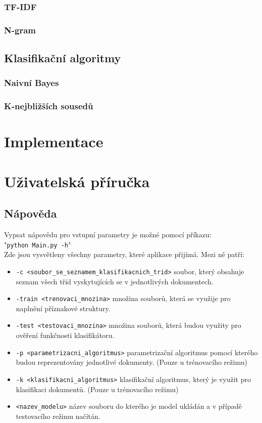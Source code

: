 \documentclass[ 12pt, a4paper]{article}
\begin{document}
\subsubsection{TF-IDF}
\subsubsection{N-gram}

\subsection{Klasifikační algoritmy}
\subsubsection{Naivní Bayes}
\subsubsection{K-nejbližších sousedů}

\newpage
\section{Implementace}


\newpage
\section{Uživatelská příručka}
\subsection{Nápověda}
Vypsat nápovědu pro vstupní parametry je možné pomocí příkazu:\\
"\texttt{python Main.py -h}"\\
Zde jsou vysvětleny všechny parametry, které aplikace přijímá. Mezi ně patří:
\begin{itemize}
	\item \texttt{-c <soubor\_se\_seznamem\_klasifikacnich\_trid>} soubor, který obsahuje seznam všech tříd vyskytujících se v jednotlivých dokumentech.
	\item \texttt{-train <trenovaci\_mnozina>} množina souborů, která se využije pro naplnění příznakové struktury.
	\item \texttt{-test <testovaci\_mnozina>} množina souborů, která budou využity pro ověření funkčnosti klasifikátoru.
	\item \texttt{-p <parametrizacni\_algoritmus>} parametrizační algoritmus pomocí kterého budou reprezentovány jednotlivé dokumenty. (Pouze u trénovacího režimu) 
	\item \texttt{-k <klasifikacni\_algoritmus>} klasifikační algoritmus, který je využit pro klasifikaci dokumentů. (Pouze u trénovacího režimu)
	\item \texttt{<nazev\_modelu>} název souboru do kterého je model ukládán a v případě testovacího režimu načítán.
\end{itemize}
\end{document}
